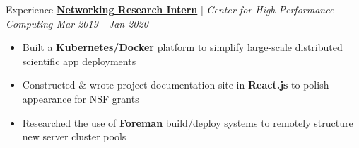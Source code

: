 \documentclass{resume/resume}
\begin{document}
\begin{rSection}{Experience}
  \href{https://slateci.io/}{\bf Networking Research Intern} | {\em Center for High-Performance Computing \hfill Mar 2019 - Jan 2020}
  \vspace{-6pt}
  \begin{itemize}[nosep]
    \item Built a {\bf Kubernetes/Docker} platform to simplify large-scale distributed scientific app deployments
    \item Constructed \& wrote project documentation site in {\bf React.js} to polish appearance for NSF grants
    \item Researched the use of {\bf Foreman} build/deploy systems to remotely structure new server cluster pools
  \end{itemize}
  
  

  

\end{rSection}
\end{document}
